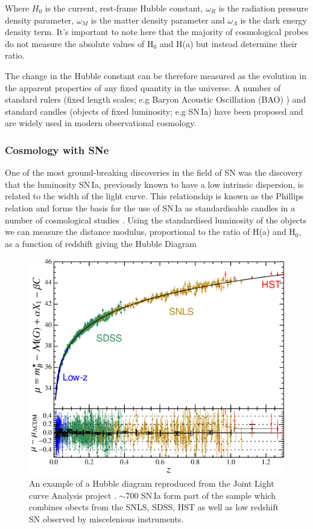 \noindent Where $H_0$ is the current, rest-frame Hubble constant, $\omega_{R}$ is the radiation pressure density parameter, $\omega_{M}$ is the matter density parameter and $\omega_{\Lambda}$ is the dark energy density term. It's important to note here that the majority of cosmological probes do not measure the absolute values of H$_{0}$ and H(a) but instead determine their ratio.

The change in the Hubble constant can be therefore measured as the evolution in the apparent properties of any fixed quantity in the universe. A number of standard rulers (fixed length scales; e.g Baryon Acoustic Oscillation (BAO) \citep{Cole2005,Eisenstein2005}) and standard candles (objects of fixed luminosity; e.g SN\,Ia) have been proposed and are widely used in modern observational cosmology.

\subsubsection{Cosmology with SNe}
One of the most ground-breaking discoveries in the field of SN was the discovery that the luminosity SN\,Ia, previously known to have a low intrinsic dispersion, is related to the width of the light curve. This relationship is known as the Phillips relation \citep{Phillips1993} and forms the basis for the use of SN\,Ia as standardisable candles in a number of cosmological studies \citep{Perlmutter1997,Riess1998,Astier2005,Betoule2014}. Using the standardised luminosity of the objects we can measure the distance modulus, proportional to the ratio of H(a) and H$_0$, as a function of redshift giving the Hubble Diagram \citep[;][]{Betoule2014}

\begin{figure}
  \includegraphics[width=\textwidth]{Figures/Chapter1/Betoule14Hubble.png}
  \caption{An example of a Hubble diagram reproduced from the Joint Light curve Analysis project \citep{Betoule2014}. $\sim$700 SN\,Ia form part of the sample which combines obects from the SNLS, SDSS, HST as well as low redshift SN observed by miscelenious instruments.}
  \label{fig:Betoule14Hubble}
\end{figure}

